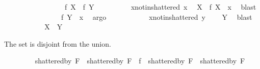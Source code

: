 \begin{isabellebody}
\ \ \ \ \ \ \ \ \ \ \ \ \ \ \ \ {}{\isacharcolon}{\kern0pt}\ {\isachardoublequoteopen}{\isacharquery}{\kern0pt}f\ X\ {\isacharequal}{\kern0pt}\ {\isacharquery}{\kern0pt}f\ Y{\isachardoublequoteclose}\isanewline
\ \ \ \ \ \ \ \ \isamarkupfalse%
\ x{\isacharunderscore}{\kern0pt}not{\isacharunderscore}{\kern0pt}in{\isacharunderscore}{\kern0pt}shattered\ x{}\ \isamarkupfalse%
\ {\isachardoublequoteopen}X\ {\isacharequal}{\kern0pt}\ {\isacharquery}{\kern0pt}f\ X\ {\isacharminus}{\kern0pt}\ {\isacharbraceleft}{\kern0pt}x{\isacharbraceright}{\kern0pt}{\isachardoublequoteclose}\ \isamarkupfalse%
\ blast\isanewline
\ \ \ \ \ \ \ \ \isamarkupfalse%
\ \isamarkupfalse%
\ {}\ \isamarkupfalse%
\ {\isachardoublequoteopen}{\isachardot}{\kern0pt}{\isachardot}{\kern0pt}{\isachardot}{\kern0pt}\ {\isacharequal}{\kern0pt}\ {\isacharquery}{\kern0pt}f\ Y\ {\isacharminus}{\kern0pt}\ {\isacharbraceleft}{\kern0pt}x{\isacharbraceright}{\kern0pt}{\isachardoublequoteclose}\ \isamarkupfalse%
\ argo\isanewline
\ \ \ \ \ \ \ \ \isamarkupfalse%
\ \isamarkupfalse%
\ x{\isacharunderscore}{\kern0pt}not{\isacharunderscore}{\kern0pt}in{\isacharunderscore}{\kern0pt}shattered\ y{}\ \isamarkupfalse%
\ {\isachardoublequoteopen}{\isachardot}{\kern0pt}{\isachardot}{\kern0pt}{\isachardot}{\kern0pt}\ {\isacharequal}{\kern0pt}\ Y{\isachardoublequoteclose}\ \isamarkupfalse%
\ blast\isanewline
\ \ \ \ \ \ \ \ \isamarkupfalse%
\ \isamarkupfalse%
\ {\isachardoublequoteopen}X\ {\isacharequal}{\kern0pt}\ Y{\isachardoublequoteclose}\ \isacommand{{\isachardot}{\kern0pt}}\isamarkupfalse%
\isanewline
\ \ \ \ \ \ \isamarkupfalse%
%
\begin{isamarkuptext}%
The set is disjoint from the union.%
\end{isamarkuptext}\isamarkuptrue%
\ \ \ \ \ \ \isamarkupfalse%
\ {}{\isacharcolon}{\kern0pt}\ {\isachardoublequoteopen}{\isacharparenleft}{\kern0pt}shattered{\isacharunderscore}{\kern0pt}by\ {\isacharquery}{\kern0pt}F{}\ {\isasymunion}\ shattered{\isacharunderscore}{\kern0pt}by\ {\isacharquery}{\kern0pt}F{}{\isacharparenright}{\kern0pt}\ {\isasyminter}\ {\isacharquery}{\kern0pt}f\ {\isacharbackquote}{\kern0pt}\ {\isacharparenleft}{\kern0pt}shattered{\isacharunderscore}{\kern0pt}by\ {\isacharquery}{\kern0pt}F{}\ {\isasyminter}\ shattered{\isacharunderscore}{\kern0pt}by\ {\isacharquery}{\kern0pt}F{}{\isacharparenright}{\kern0pt}\ {\isacharequal}{\kern0pt}\ {\isacharbraceleft}{\kern0pt}{\isacharbraceright}{\kern0pt}{\isachardoublequoteclose}\isanewline

\end{isabellebody}
